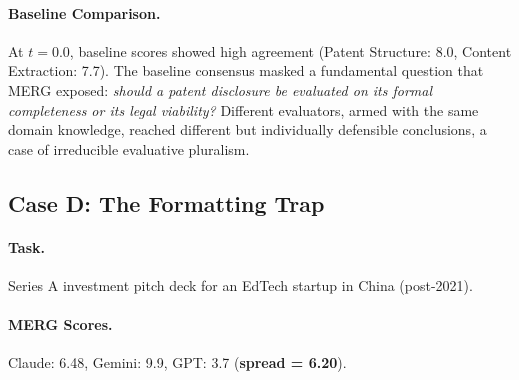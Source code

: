 \documentclass{article}
\begin{document}
\paragraph{Baseline Comparison.} At $t{=}0.0$, baseline scores showed high agreement (Patent Structure: 8.0, Content Extraction: 7.7). The baseline consensus masked a fundamental question that MERG exposed: \textit{should a patent disclosure be evaluated on its formal completeness or its legal viability?} Different evaluators, armed with the same domain knowledge, reached different but individually defensible conclusions, a case of irreducible evaluative pluralism.

\subsection{Case D: The Formatting Trap}
\label{case:formatting_trap}

\paragraph{Task.} Series A investment pitch deck for an EdTech startup in China (post-2021).

\paragraph{MERG Scores.} Claude: 6.48, Gemini: 9.9, GPT: 3.7 (\textbf{spread = 6.20}).
\end{document}
